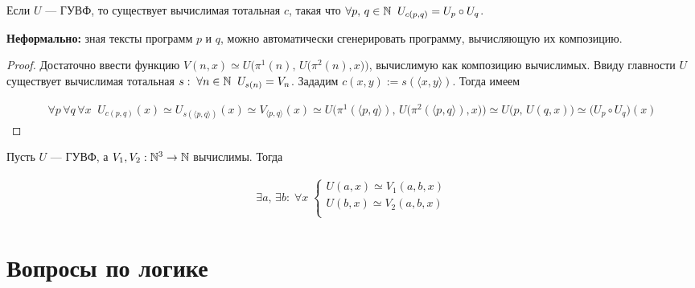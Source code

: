 \documentclass[a4paper, fleqn]{article}
\newcommand{\pair}[1]{\langle#1\rangle}
\begin{document}
        \begin{proposition}
            Если $U$ --- ГУВФ, то существует вычислимая тотальная $c$, такая что $\forall p, \, q \in \mathbb{N} \;\; U_{c(p, q)} = U_p \circ U_q$.
        \end{proposition}

        \textbf{Неформально:} зная тексты программ $p$ и $q$, можно автоматически сгенерировать программу, вычисляющую их композицию.

        \begin{proof}
            Достаточно ввести функцию $V(n, x) \simeq U\bigl(\pi^1(n), \, U\bigl(\pi^2(n), x\bigr)\bigr)$, вычислимую как композицию вычислимых. Ввиду главности $U$ существует вычислимая тотальная $s: \; \forall n \in \mathbb{N} \;\; U_{s(n)} = V_n$. Зададим $c(x, y) := s(\pair{x, y})$. Тогда имеем

            \begin{equation*}
            \begin{gathered}
            \forall p \, \forall q \, \forall x \;\; U_{c(p, q)}(x) \simeq U_{s(\pair{p, q})}(x) \simeq V_{\pair{p, q}}(x) \simeq U\bigl(\pi^1(\pair{p, q}), \, U\bigl(\pi^2(\pair{p, q}), x\bigr)\bigr) \simeq U\bigl(p, \, U(q, x)\bigr) \simeq \bigl(U_p \circ U_q\bigr)(x)
            \end{gathered}
            \end{equation*}
        \end{proof}

        \begin{theorem}
            Пусть $U$ --- ГУВФ, а $V_1, V_2 : \mathbb{N}^3 \to \mathbb{N}$ вычислимы. Тогда

            \begin{equation*}
            \begin{gathered}
            \exists a, \, \exists b : \; \forall x \;
            \begin{cases}
            U(a, x) \simeq V_1(a, b, x) \\
            U(b, x) \simeq V_2(a, b, x) \\
            \end{cases}
            \end{gathered}
            \end{equation*}
        \end{theorem}


\section{Вопросы по логике}
\end{document}

